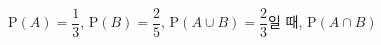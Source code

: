 $\mathrm{P}(A)=\dfrac{1}{3}$, $\mathrm{P}(B)=\dfrac{2}{5}$, $\mathrm{P}(A\cup B)=\dfrac{2}{3}$일 때, $\mathrm{P}(A\cap B)$
